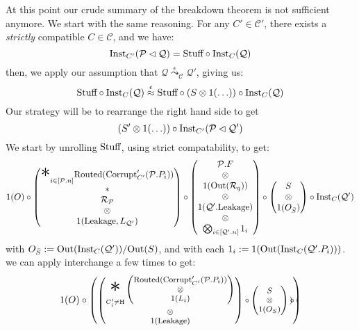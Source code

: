 \begin{theorem}
   At this point our crude summary of the breakdown theorem is not
  sufficient anymore.
  We start with the same reasoning.
  For any $C' \in \mathcal{C}'$, there exists a \emph{strictly}
  compatible $C \in \mathcal{C}$, and we have:
  $$
  \tx{Inst}_{C'}(\mathcal{P} \lhd \mathcal{Q}) = \tx{Stuff} \circ \tx{Inst}_C(\mathcal{Q})
  $$
  then, we apply our assumption that $\mathcal{Q} \overset{\epsilon}{\leadsto}_{\mathcal{C}} \mathcal{Q}'$,
  giving us:
  $$
  \tx{Stuff} \circ \tx{Inst}_C(\mathcal{Q}) \overset{\epsilon}{\approx} \tx{Stuff} \circ (S \otimes 1(\ldots)) \circ \tx{Inst}_C(\mathcal{Q})
  $$
  Our strategy will be to rearrange the right hand side to get
  $$
  {(S' \otimes 1(\ldots)) \circ \tx{Inst}_{C'}(\mathcal{P} \lhd \mathcal{Q}')}
  $$
  We start by unrolling $\tx{Stuff}$, using strict compatability, to get:
  $$
  1(O)\circ
  \begin{pmatrix}
    {\displaystyle \bigast}_{i \in [\mathcal{P}.n]} \tx{Routed}(\tx{Corrupt}'_{C'}(\mathcal{P}.P_i))
    \cr
    *\cr
    \mathcal{R}_{\mathcal{P}}\cr
    \otimes\cr
    1(\tx{Leakage}, L_{\mathcal{Q}'})
  \end{pmatrix}
  \circ
  \begin{pmatrix}
    \mathcal{P}.F\cr
    \otimes\cr
    1(\tx{Out}(\mathcal{R}_q))\cr
    \otimes\cr
    1(\mathcal{Q}'.\tx{Leakage})\cr
    \otimes\cr
    \bigotimes_{i \in [\mathcal{Q}'.n]} 1_i\cr
  \end{pmatrix}
  \circ
  \begin{pmatrix}
    S\cr
    \otimes\cr
    1(O_{\bar{S}})
  \end{pmatrix}
  \circ
  \tx{Inst}_C(\mathcal{Q}')
  $$
  with $O_{\bar{S}} := \tx{Out}(\tx{Inst}_C(\mathcal{Q}')) / \tx{Out}(S)$,
  and with each $1_i := 1(\tx{Out}(\tx{Inst}_C(\mathcal{Q}'.P_i)))$.
  we can apply interchange a few times to get:
  $$
  \footnotesize
  1(O) \circ
  \begin{pmatrix}
    \begin{pmatrix}
    {\displaystyle \bigast_{C'_i \neq \tx{H}}}
    \begin{pmatrix}
      \tx{Routed}(\tx{Corrupt}'_{C'}(\mathcal{P}.P_i))\cr
      \otimes\cr
      1(L_i)
    \end{pmatrix}\cr
    \otimes\cr
    1(\tx{Leakage})
    \end{pmatrix}
    \circ
    \begin{pmatrix}
      S\cr
      \otimes\cr
      1(O_S)
    \end{pmatrix}
    \circ
    \begin{pmatrix}

\end{pmatrix}
\end{pmatrix}$$
\end{theorem}
